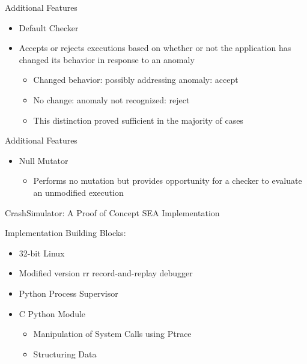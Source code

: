 \documentclass[pdf]{beamer}
\begin{document}


\begin{frame}{Additional Features}
  \begin{itemize}
    \item{Default Checker}
    \item{Accepts or rejects executions based on whether or not the
      application has changed its behavior in response to an anomaly}
      \begin{itemize}
        \item{Changed behavior: possibly addressing anomaly: accept}
        \item{No change: anomaly not recognized: reject}
        \item{This distinction proved sufficient in the majority of cases}
      \end{itemize}
  \end{itemize}
\end{frame}


\begin{frame}{Additional Features}
  \begin{itemize}
    \item{Null Mutator}
      \begin{itemize}
        \item{Performs no mutation but provides opportunity for a checker to
          evaluate an unmodified execution}
      \end{itemize}
  \end{itemize}
\end{frame}


\begin{frame}{CrashSimulator: A Proof of Concept SEA Implementation}

  Implementation Building Blocks:

  \begin{itemize}
    \item{32-bit Linux}
    \item{Modified version rr record-and-replay debugger}
    \item{Python Process Supervisor}
    \item{C Python Module}
      \begin{itemize}
        \item{Manipulation of System Calls using Ptrace}
        \item{Structuring Data}
      \end{itemize}
  \end{itemize}
\end{frame}
\end{document}
